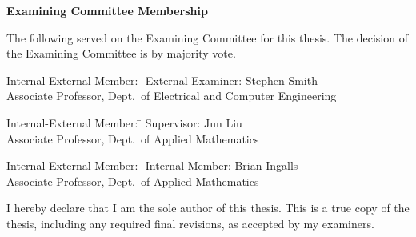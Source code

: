 \cleardoublepage %

 
\begin{center}\textbf{Examining Committee Membership}\end{center}
  \noindent
The following served on the Examining Committee for this thesis. The decision of the Examining Committee is by majority vote.
  \bigskip
  
  \noindent
\begin{tabbing}
Internal-External Member: \=  \kill %
External Examiner: \>  Stephen Smith \\ 
\> Associate Professor, Dept.\ of Electrical and Computer Engineering \\
\end{tabbing} 
  \bigskip
  
  \noindent
\begin{tabbing}
Internal-External Member: \=  \kill %
Supervisor: \> Jun Liu \\
\> Associate Professor, Dept.\ of Applied Mathematics \\
\end{tabbing}
  \bigskip
  
  \noindent
  \begin{tabbing}
Internal-External Member: \=  \kill %
Internal Member: \> Brian Ingalls \\
\> Associate Professor, Dept.\ of Applied Mathematics \\
\end{tabbing}
  

\cleardoublepage

  \noindent
I hereby declare that I am the sole author of this thesis. This is a true copy of the thesis, including any required final revisions, as accepted by my examiners.

